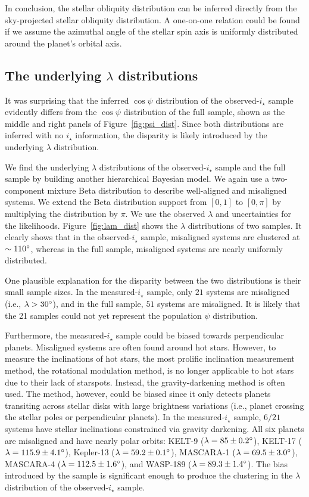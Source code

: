 \documentclass[twocolumn,times]{aastex631}
\begin{document}
In conclusion, the stellar obliquity distribution can be inferred directly from the sky-projected stellar obliquity distribution. A one-on-one relation could be found if we assume the azimuthal angle of the stellar spin axis is uniformly distributed around the planet's orbital axis.

\subsection{The underlying \texorpdfstring{$\lambda$}{lambda} distributions}

It was surprising that the inferred $\cos{\psi}$ distribution of the observed-$i_\star$ sample evidently differs from the $\cos{\psi}$ distribution of the full sample, shown as the middle and right panels of Figure~\ref{fig:psi_dist}. Since both distributions are inferred with no $i_\star$ information, the disparity is likely introduced by the underlying $\lambda$ distribution.

We find the underlying $\lambda$ distributions of the observed-$i_\star$ sample and the full sample by building another hierarchical Bayesian model. We again use a two-component mixture Beta distribution to describe well-aligned and misaligned systems. We extend the Beta distribution support from $[0,1]$ to $[0,\pi]$ by multiplying the distribution by $\pi$. We use the observed $\lambda$ and uncertainties for the likelihoods. Figure~\ref{fig:lam_dist} shows the $\lambda$ distributions of two samples. It clearly shows that in the observed-$i_\star$ sample, misaligned systems are clustered at $\sim 110\mbox{$^\circ$}$, whereas in the full sample, misaligned systems are nearly uniformly distributed. 

One plausible explanation for the disparity between the two distributions is their small sample sizes. In the measured-$i_\star$ sample, only $21$ systems are misaligned  (i.e., $\lambda > 30\mbox{$^\circ$}$), and in the full sample, $51$ systems are misaligned. It is likely that the 21 samples could not yet represent the population $\psi$ distribution. 

Furthermore, the measured-$i_\star$ sample could be biased towards perpendicular planets. Misaligned systems are often found around hot stars. However, to measure the inclinations of hot stars, the most prolific inclination measurement method, the rotational modulation method, is no longer applicable to hot stars due to their lack of starspots. Instead, the gravity-darkening method is often used. The method, however, could be biased since it only detects planets transiting across stellar disks with large brightness variations (i.e., planet crossing the stellar poles or perpendicular planets). In the measured-$i_\star$ sample, $6/21$ systems have stellar inclinations constrained via gravity darkening. All six planets are misaligned and have nearly polar orbits: 
KELT-9 ($\lambda = 85 \pm 0.2\mbox{$^\circ$}$),
KELT-17 ($\lambda = 115.9 \pm 4.1 \mbox{$^\circ$}$), 
Kepler-13 ($\lambda = 59.2 \pm 0.1 \mbox{$^\circ$}$), 
MASCARA-1 ($\lambda = 69.5 \pm 3.0 \mbox{$^\circ$}$),
MASCARA-4 ($\lambda = 112.5 \pm 1.6 \mbox{$^\circ$}$), 
and WASP-189 ($\lambda = 89.3 \pm 1.4 \mbox{$^\circ$}$).
The bias introduced by the sample is significant enough to produce the clustering in the $\lambda$ distribution of the observed-$i_\star$ sample.
\end{document}
